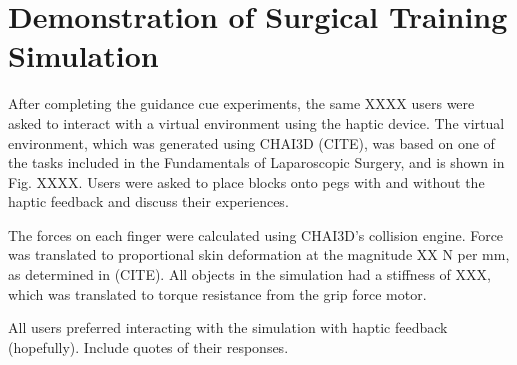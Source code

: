 \section{Demonstration of Surgical Training Simulation}
After completing the guidance cue experiments, the same XXXX users were asked to interact with a virtual environment using the haptic device. The virtual environment, which was generated using CHAI3D (CITE), was based on one of the tasks included in the Fundamentals of Laparoscopic Surgery, and is shown in Fig. XXXX. Users were asked to place blocks onto pegs with and without the haptic feedback and discuss their experiences. 

The forces on each finger were calculated using CHAI3D's collision engine. Force was translated to proportional skin deformation at the magnitude XX N per mm, as determined in (CITE). All objects in the simulation had a stiffness of XXX, which was translated to torque resistance from the grip force motor. 

All users preferred interacting with the simulation with haptic feedback (hopefully). Include quotes of their responses.

